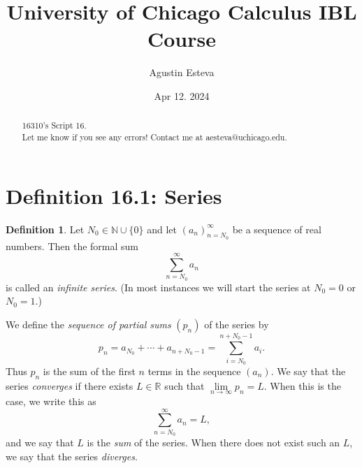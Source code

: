 \documentclass[openany, amssymb, psamsfonts]{amsart}
\title{University of Chicago Calculus IBL Course}
\author{Agustin Esteva}
\date{Apr 12. 2024}
\newcommand{\bbN}{\mathbb{N}}
\newcommand{\bbR}{\mathbb{R}}
\theoremstyle{definition}
\newtheorem{defn}{Definition}[section]
\numberwithin{equation}{section}
\begin{document}
\begin{abstract}

16310's Script 16.\\ Let me know if you see any errors! Contact me at aesteva@uchicago.edu.


\end{abstract}

\maketitle

\tableofcontents

\setcounter{section}{16}

\section*{Definition 16.1: Series}
\begin{defn}
Let $N_0\in\bbN\cup\{0\}$ and let $(a_n)_{n=N_0}^\infty$ be a sequence of real numbers. Then the formal sum	
	\[
		\sum_{n = N_0}^{\infty} a_n
	\]
is called an {\em infinite series}. 	
(In most instances we will start the series at $N_0=0$ or $N_0=1.$)
 

	We define the \emph{sequence of partial sums} $(p_n)$ of the series by
	\[
		p_n = a_{N_0} + \dotsb + a_{n+N_0-1} = \sum_{i=N_0}^{n+N_0-1} a_i.
	\]
	Thus $p_n$ is the sum of the first $n$ terms in the sequence $(a_n).$ We say that the series \emph{converges} if there exists $L \in \bbR$ such that $\lim\limits_{n \to \infty} p_n = L$.  When this is the case, we write this as
	\[
		\sum_{n = N_0}^{\infty} a_n = L,
	\]
	and we say that $L$ is the \emph{sum} of the series. When there does not exist such an $L$, we say that the series \emph{diverges}.
\end{defn}
\end{document}
